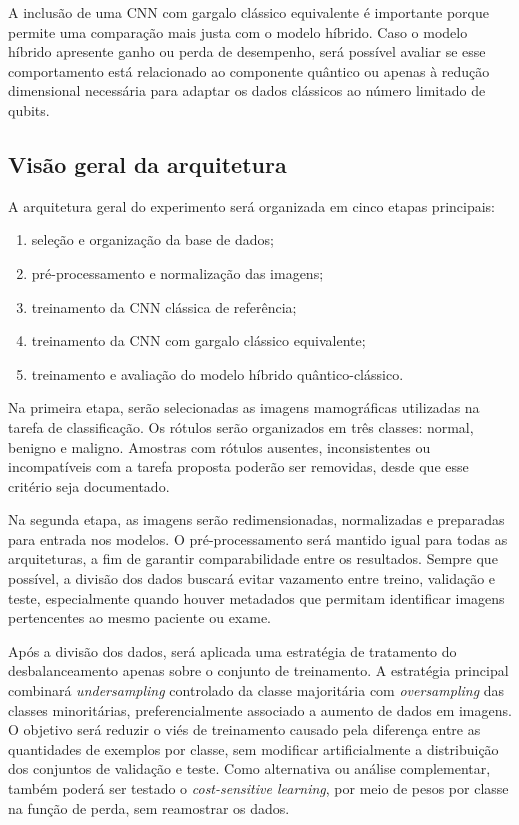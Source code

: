 \documentclass[
    12pt,
    openright,
    oneside,
    a4paper,
    english,
    brazil
]{abntex2}
\begin{document}
A inclusão de uma CNN com gargalo clássico equivalente é importante porque permite uma comparação mais justa com o modelo híbrido. Caso o modelo híbrido apresente ganho ou perda de desempenho, será possível avaliar se esse comportamento está relacionado ao componente quântico ou apenas à redução dimensional necessária para adaptar os dados clássicos ao número limitado de qubits.

\subsection{Visão geral da arquitetura}
\label{subsec:visao_arquitetura}

A arquitetura geral do experimento será organizada em cinco etapas principais:

\begin{enumerate}
    \item seleção e organização da base de dados;
    \item pré-processamento e normalização das imagens;
    \item treinamento da CNN clássica de referência;
    \item treinamento da CNN com gargalo clássico equivalente;
    \item treinamento e avaliação do modelo híbrido quântico-clássico.
\end{enumerate}

Na primeira etapa, serão selecionadas as imagens mamográficas utilizadas na tarefa de classificação. Os rótulos serão organizados em três classes: normal, benigno e maligno. Amostras com rótulos ausentes, inconsistentes ou incompatíveis com a tarefa proposta poderão ser removidas, desde que esse critério seja documentado.

Na segunda etapa, as imagens serão redimensionadas, normalizadas e preparadas para entrada nos modelos. O pré-processamento será mantido igual para todas as arquiteturas, a fim de garantir comparabilidade entre os resultados. Sempre que possível, a divisão dos dados buscará evitar vazamento entre treino, validação e teste, especialmente quando houver metadados que permitam identificar imagens pertencentes ao mesmo paciente ou exame.

Após a divisão dos dados, será aplicada uma estratégia de tratamento do desbalanceamento apenas sobre o conjunto de treinamento. A estratégia principal combinará \textit{undersampling} controlado da classe majoritária com \textit{oversampling} das classes minoritárias, preferencialmente associado a aumento de dados em imagens. O objetivo será reduzir o viés de treinamento causado pela diferença entre as quantidades de exemplos por classe, sem modificar artificialmente a distribuição dos conjuntos de validação e teste. Como alternativa ou análise complementar, também poderá ser testado o \textit{cost-sensitive learning}, por meio de pesos por classe na função de perda, sem reamostrar os dados.
\end{document}
